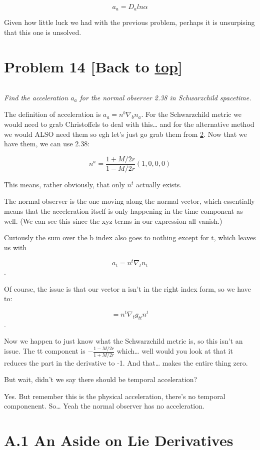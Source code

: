 \documentclass[landscape,letterpaper,10pt,english]{article}
\begin{document}
\[ a_a = D_a ln \alpha \]

Given how little luck we had with the previous problem, perhaps it is
unsurpising that this one is unsolved.

    \hypertarget{problem-14-back-to-top}{%
\section{\texorpdfstring{Problem 14 {[}Back to
\hyperref[toc]{top}{]}}{Problem 14 {[}Back to {]}}}\label{problem-14-back-to-top}}

\[\label{P14}\]

\emph{Find the acceleration \(a_a\) for the normal observer 2.38 in
Schwarzchild spacetime.}

The definition of acceleration is \(a_a = n^b \nabla_b n_a\). For the
Schwarzchild metric we would need to grab Christoffels to deal with
this\ldots{} and for the alternative method we would ALSO need them so
egh let's just go grab them from \hyperref[2]{2}. Now that we have them,
we can use 2.38:

\[ n^a = \frac{1+M/2r}{1-M/2r}(1,0,0,0) \]

This means, rather obviously, that only \(n^t\) actually exists.

    The normal observer is the one moving along the normal vector, which
essentially means that the acceleration itself is only happening in the
time component as well. (We can see this since the xyz terms in our
expression all vanish.)

Curiously the sum over the b index also goes to nothing except for t,
which leaves us with

\[ a_t = n^t \nabla_t n_t\].

Of course, the issue is that our vector n isn't in the right index form,
so we have to:

\[ = n^t \nabla_t g_{tt} n^t\].

    Now we happen to just know what the Schwarzchild metric is, so this
isn't an issue. The tt component is \(-\frac{1-M/2r}{1+M/2r}\)
which\ldots{} well would you look at that it reduces the part in the
derivative to -1. And that\ldots{} makes the entire thing zero.

But wait, didn't we say there should be temporal acceleration?

Yes. But remember this is the physical acceleration, there's no temporal
componenent. So\ldots{} Yeah the normal observer has no acceleration.

    \hypertarget{a.1-an-aside-on-lie-derivatives}{%
\section{A.1 An Aside on Lie
Derivatives}\label{a.1-an-aside-on-lie-derivatives}}
\end{document}
